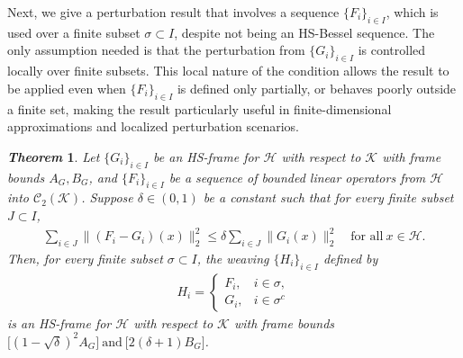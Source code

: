 \documentclass[reqno]{amsart}
\theoremstyle{plain}
\newtheorem{thm}{\it Theorem}[section]
\theoremstyle{remark}
\numberwithin{equation}{section}
\begin{document}
Next, we give a perturbation result that involves a sequence $\{F_i\}_{i \in I}$, which is used over a finite subset $\sigma \subset I$, despite not being an HS-Bessel sequence. The only assumption needed is that the perturbation from $\{G_i\}_{i \in I}$ is controlled locally over finite subsets. This local nature of the condition allows the result to be applied even when $\{F_i\}_{i \in I}$ is defined only partially, or behaves poorly outside a finite set, making the result particularly useful in finite-dimensional approximations and localized perturbation scenarios.
\begin{thm}\label{th4}
Let  $\{G_i\}_{i \in I}$ be an HS-frame for $\mathcal{H}$ with respect to $\mathcal{K}$ with frame bounds $A_G, B_G$, and $\{F_i\}_{i \in I}$ be a sequence of bounded linear operators from  $\mathcal{H}$ into $\mathcal{C}_2(\mathcal{K})$. Suppose $\delta \in (0,1)$ be a constant such that for every finite subset $J \subset I$,
\begin{align*}
\sum_{i \in J} \| (F_i - G_i)(x) \|_2^2 \leq \delta \sum_{i \in J} \| G_i(x) \|_2^2 \quad \text{for all} \ x \in \mathcal{H}.
\end{align*}
Then, for every finite subset $\sigma \subset I$, the weaving $\{H_i\}_{i \in I}$ defined by
\begin{align*}
H_i = \begin{cases}
F_i, & i \in \sigma, \\
G_i, & i \in \sigma^c
\end{cases}
\end{align*}
is an HS-frame for $\mathcal{H}$ with respect to $\mathcal{K}$ with frame bounds $\big[(1 - \sqrt{\delta})^2 A_G\big] \ \text{and} \ \big[2(\delta +1) B_G\big]$.
\end{thm}
\end{document}
